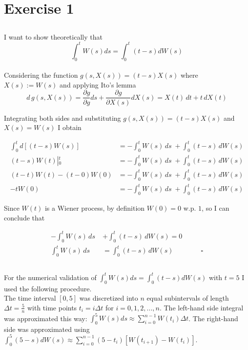 \section{Exercise 1}

\subsection{}

I want to show theoretically that
\begin{equation}
    \int_0^t W(s)ds = \int_0^t (t-s)dW(s)
\end{equation} \\

Considering the function $g(s,X(s)) = (t-s)X(s)$ where $X(s):=W(s)$ and applying Ito's lemma
\begin{equation*}
d\,g(s,X(s)) = \frac{\partial g}{\partial g} ds +
               \frac{\partial g}{\partial X(s)} dX(s)
            = X(t)\,dt + t\,dX(t)
\end{equation*}

Integrating both sides and substituting $g(s,X(s))=(t-s)X(s)$ and $X(s)=W(s)$ I obtain

\begin{align*}
    \int_0^t{d\left[(t-s)W(s)\right]} &=  -\int_0^t{W(s)\,ds} \;+ \int_0^t{(t-s)\,dW(s)} \\
    (t-s)W(t) \left|^t_0 \right. &= -\int_0^t{W(s)\,ds} \;+ \int_0^t{(t-s)\,dW(s)} \\
    (t-t)W(t) - (t-0)W(0) &= -\int_0^t{W(s)\,ds} \;+ \int_0^t{(t-s)\,dW(s)} \\ 
    -tW(0) &= -\int_0^t{W(s)\,ds} \;+ \int_0^t{(t-s)\,dW(s)}
\end{align*}

Since $W(t)$ is a Wiener process, by definition $W(0)=0$ w.p. $1$, so I can conclude that

\begin{align*}
    -\int_0^t{W(s)\,ds} \;&+ \int_0^t{(t-s)\,dW(s)} = 0 \\ 
    \int_0^t{W(s)\,ds} &= \int_0^t{(t-s)\,dW(s)} \qquad \qquad \square
\end{align*}

\subsection{}

For the numerical validation of $\int_0^t W(s)ds = \int_0^t (t-s)dW(s)$ with $t=5$ I used the following procedure. \\
The time interval $[0,5]$ was discretized into $n$ equal subintervals of length $\Delta t = \frac{5}{n}$ with time points $t_i = i\Delta t$ for $i = 0,1,2,...,n$. The left-hand side integral was approximated this way: $\int_0^5 W(s)ds \approx \sum_{i=0}^{n-1} W(t_i) \Delta t$. The right-hand side was approximated using  $\int_0^5 (5-s)dW(s) \approx \sum_{i=0}^{n-1} (5-t_i)[W(t_{i+1})-W(t_i)]$.

